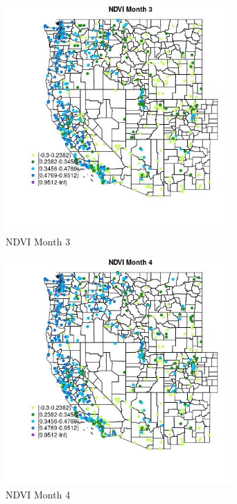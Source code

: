 \begin{figure} 
\centering  
\includegraphics[width=0.77\textwidth]{Code_Outputs/Report_ML_input_PM25_Step4_part_f_de_duplicated_aveswNAs_MapObsMo3NDVI.jpg} 
\caption{\label{fig:Report_ML_input_PM25_Step4_part_f_de_duplicated_aveswNAsMapObsMo3NDVI}NDVI Month 3} 
\end{figure} 
 

\begin{figure} 
\centering  
\includegraphics[width=0.77\textwidth]{Code_Outputs/Report_ML_input_PM25_Step4_part_f_de_duplicated_aveswNAs_MapObsMo4NDVI.jpg} 
\caption{\label{fig:Report_ML_input_PM25_Step4_part_f_de_duplicated_aveswNAsMapObsMo4NDVI}NDVI Month 4} 
\end{figure} 
 

